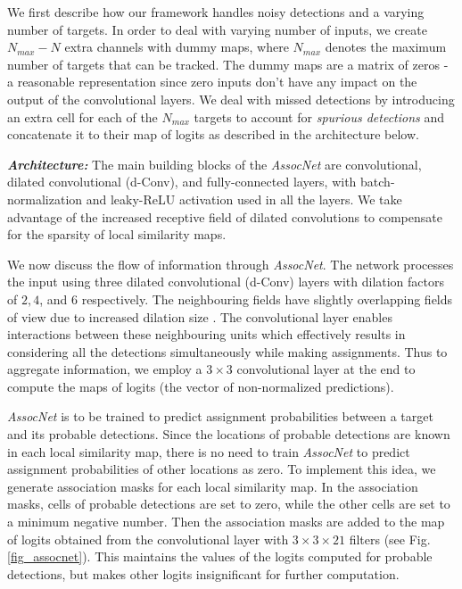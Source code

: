 \documentclass[letterpaper, 10 pt, conference]{ieeeconf}
\begin{document}
\par We first describe how our framework handles noisy detections and a varying number of targets. In order to deal with varying number of inputs, we create $N_{max}-N$ extra channels with dummy maps, where $N_{max}$ denotes the maximum number of targets that can be tracked. The dummy maps are a matrix of zeros - a reasonable representation since zero inputs don't have any impact on the output of the convolutional layers. We deal with missed detections by introducing an extra cell for each of the $N_{max}$ targets to account for \textit{spurious detections} and concatenate it to their map of logits as described in the architecture below.

\par \textbf{\textit{Architecture:}} The main building blocks of the \textit{AssocNet} are convolutional, dilated convolutional (d-Conv), and fully-connected layers, with batch-normalization and leaky-ReLU activation used in all the layers. We take advantage of the increased receptive field of dilated convolutions \cite{MSCA_DConv} to compensate for the sparsity of local similarity maps.
\par We now discuss the flow of information through \textit{AssocNet}. The network processes the input using three dilated convolutional (d-Conv) layers with dilation factors of $2, 4$, and $6$ respectively. The neighbouring fields have slightly overlapping fields of view due to increased dilation size \cite{Effective_DConv_Segmentation_RSI}. The convolutional layer enables interactions between these neighbouring units which effectively results in considering all the detections simultaneously while making assignments. Thus to aggregate information, we employ a $3 \times 3$ convolutional layer at the end to compute the maps of logits (the vector of non-normalized predictions).
\par \textit{AssocNet} is to be trained to predict assignment probabilities between a target and its probable detections. Since the locations of probable detections are known in each local similarity map, there is no need to train \textit{AssocNet} to predict assignment probabilities of other locations as zero. To implement this idea, we generate association masks for each local similarity map. In the association masks, cells of probable detections are set to zero, while the other cells are set to a minimum negative number. Then the association masks are added to the map of logits obtained from the convolutional layer with $3\times3\times21$ filters (see Fig.\ref{fig_assocnet}). This maintains the values of the logits computed for probable detections, but makes other logits insignificant for further computation.
\end{document}
